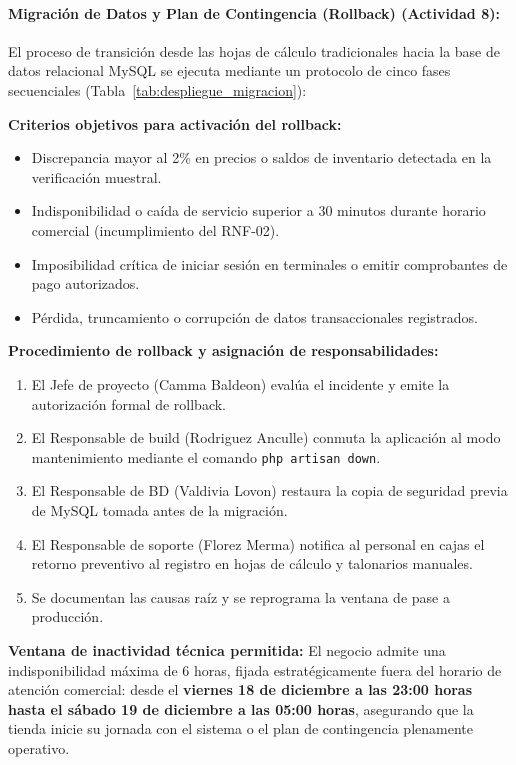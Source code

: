 \documentclass[12pt,a4paper]{article}
\begin{document}
\paragraph{Migración de Datos y Plan de Contingencia (Rollback) (Actividad 8):}
El proceso de transición desde las hojas de cálculo tradicionales hacia la base de datos relacional MySQL se ejecuta mediante un protocolo de cinco fases secuenciales (Tabla~\ref{tab:despliegue_migracion}):



\textbf{Criterios objetivos para activación del rollback:}
\begin{itemize}
  \item Discrepancia mayor al 2\% en precios o saldos de inventario detectada en la verificación muestral.
  \item Indisponibilidad o caída de servicio superior a 30 minutos durante horario comercial (incumplimiento del RNF-02).
  \item Imposibilidad crítica de iniciar sesión en terminales o emitir comprobantes de pago autorizados.
  \item Pérdida, truncamiento o corrupción de datos transaccionales registrados.
\end{itemize}

\textbf{Procedimiento de rollback y asignación de responsabilidades:}
\begin{enumerate}
  \item El Jefe de proyecto (Camma Baldeon) evalúa el incidente y emite la autorización formal de rollback.
  \item El Responsable de build (Rodriguez Anculle) conmuta la aplicación al modo mantenimiento mediante el comando \texttt{php artisan down}.
  \item El Responsable de BD (Valdivia Lovon) restaura la copia de seguridad previa de MySQL tomada antes de la migración.
  \item El Responsable de soporte (Florez Merma) notifica al personal en cajas el retorno preventivo al registro en hojas de cálculo y talonarios manuales.
  \item Se documentan las causas raíz y se reprograma la ventana de pase a producción.
\end{enumerate}

\textbf{Ventana de inactividad técnica permitida:} El negocio admite una indisponibilidad máxima de 6 horas, fijada estratégicamente fuera del horario de atención comercial: desde el \textbf{viernes 18 de diciembre a las 23:00 horas hasta el sábado 19 de diciembre a las 05:00 horas}, asegurando que la tienda inicie su jornada con el sistema o el plan de contingencia plenamente operativo.
\end{document}
